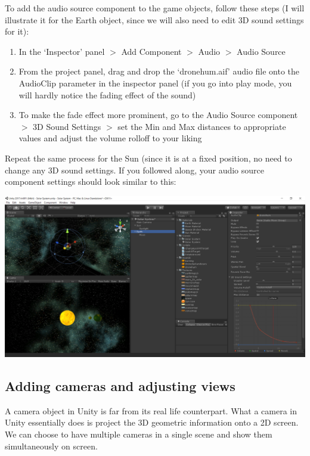 \documentclass{article}[a4paper,12pt]
\theoremstyle{definition}
\begin{document}
To add the audio source component to the game objects, follow these steps (I will illustrate it for the Earth object, since we will also need to edit 3D sound settings for it):
\begin{enumerate}
	\item In the `Inspector' panel $>$ Add Component $>$ Audio $>$ Audio Source
	\item From the project panel, drag and drop the `dronehum.aif' audio file onto the AudioClip parameter in the inspector panel (if you go into play mode, you will hardly notice the fading effect of the sound)
	\item To make the fade effect more prominent, go to the Audio Source component $>$ 3D Sound Settings $>$ set the Min and Max distances to appropriate values and adjust the volume rolloff to your liking
\end{enumerate}
Repeat the same process for the Sun (since it is at a fixed position, no need to change any 3D sound settings. If you followed along, your audio source component settings should look similar to this:
\begin{center}
\includegraphics[width=\textwidth]{adding_audio.png}
\end{center}
\subsection{Adding cameras and adjusting views}
A camera object in Unity is far from its real life counterpart. What a camera in Unity essentially does is project the 3D geometric information onto a 2D screen. We can choose to have multiple cameras in a single scene and show them simultaneously on screen.

\hrulefill
\pagebreak
\end{document}
